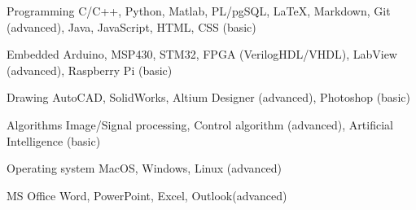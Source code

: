 

\begin{cvskills}

  \cvskill
    {Programming} %
    {C/C++, Python, Matlab, PL/pgSQL, \LaTeX, Markdown, Git (advanced), Java, JavaScript, HTML, CSS (basic)} %

  \cvskill
    {Embedded} %
    {Arduino, MSP430, STM32,  FPGA (VerilogHDL/VHDL), LabView (advanced), Raspberry Pi (basic)} %

  \cvskill
    {Drawing} %
    {AutoCAD, SolidWorks, Altium Designer (advanced), Photoshop (basic)} %

  \cvskill
    {Algorithms} %
    {Image/Signal processing, Control algorithm (advanced), Artificial Intelligence (basic)} %

  \cvskill
	{Operating system} %
	{MacOS, Windows, Linux (advanced)} %

  \cvskill
	{MS Office} %
	{Word, PowerPoint, Excel, Outlook(advanced)} %


\end{cvskills}

